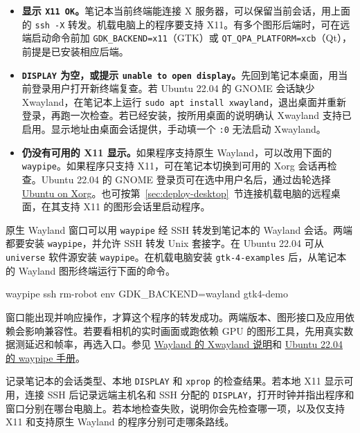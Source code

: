 \begin{itemize}
  \item \textbf{显示 \texttt{X11 OK}。}笔记本当前终端能连接 X 服务器，可以保留当前会话，用上面的 \texttt{ssh -X} 转发。机载电脑上的程序要支持 X11。有多个图形后端时，可在远端启动命令前加 \texttt{GDK\_BACKEND=x11}（GTK）或 \texttt{QT\_QPA\_PLATFORM=xcb}（Qt），前提是已安装相应后端。
  \item \textbf{\texttt{DISPLAY} 为空，或提示 \texttt{unable to open display}。}先回到笔记本桌面，用当前登录用户打开新终端复查。若 Ubuntu 22.04 的 GNOME 会话缺少 Xwayland，在笔记本上运行 \texttt{sudo apt install xwayland}，退出桌面并重新登录，再跑一次检查。若已经安装，按所用桌面的说明确认 Xwayland 支持已启用。显示地址由桌面会话提供，手动填一个 \texttt{:0} 无法启动 Xwayland。
  \item \textbf{仍没有可用的 X11 显示。}如果程序支持原生 Wayland，可以改用下面的 \texttt{waypipe}。如果程序只支持 X11，可在笔记本切换到可用的 Xorg 会话再检查。Ubuntu 22.04 的 GNOME 登录页可在选中用户名后，通过齿轮选择 \href{https://documentation.ubuntu.com/release-notes/22.04/}{Ubuntu on Xorg}。也可按第~\ref{sec:deploy-desktop}~节连接机载电脑的远程桌面，在其支持 X11 的图形会话里启动程序。
\end{itemize}

原生 Wayland 窗口可以用 \texttt{waypipe} 经 SSH 转发到笔记本的 Wayland 会话。两端都要安装 \texttt{waypipe}，并允许 SSH 转发 Unix 套接字。在 Ubuntu 22.04 可从 \texttt{universe} 软件源安装 \texttt{waypipe}。在机载电脑安装 \texttt{gtk-4-examples} 后，从笔记本的 Wayland 图形终端运行下面的命令。
\begin{tbash}
waypipe ssh rm-robot env GDK_BACKEND=wayland gtk4-demo
\end{tbash}
窗口能出现并响应操作，才算这个程序的转发成功。两端版本、图形接口及应用依赖会影响兼容性。若要看相机的实时画面或跑依赖 GPU 的图形工具，先用真实数据测延迟和帧率，再选入口。参见 \href{https://wayland.freedesktop.org/docs/book/Xwayland.html}{Wayland 的 Xwayland 说明}和 \href{https://manpages.ubuntu.com/manpages/jammy/man1/waypipe.1.html}{Ubuntu 22.04 的 waypipe 手册}。

\begin{exercise}\label{ex:deploy-x11}
记录笔记本的会话类型、本地 \texttt{DISPLAY} 和 \texttt{xprop} 的检查结果。若本地 X11 显示可用，连接 SSH 后记录远端主机名和 SSH 分配的 \texttt{DISPLAY}，打开时钟并指出程序和窗口分别在哪台电脑上。若本地检查失败，说明你会先检查哪一项，以及仅支持 X11 和支持原生 Wayland 的程序分别可走哪条路线。
\end{exercise}

